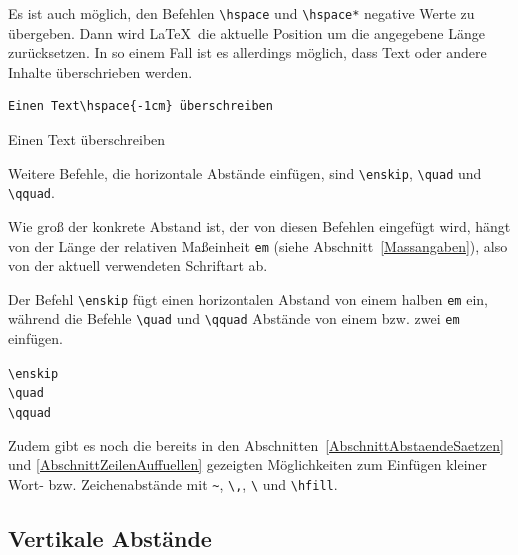 \documentclass[a4paper,10pt,twoside]{scrbook}
\begin{document}
Es ist auch möglich, den Befehlen \verb!\hspace! 
und \verb!\hspace*! negative Werte zu
übergeben. Dann wird \LaTeX\ die aktuelle
Position um die angegebene Länge zurücksetzen. In so einem Fall ist es allerdings
möglich, dass Text oder andere Inhalte überschrieben werden.



\begin{minipage}[c]{0.6\textwidth}
\setlength{\parskip}{1em}
\frenchspacing
\begin{Verbatim}[frame=single]
Einen Text\hspace{-1cm} überschreiben
\end{Verbatim}
\end{minipage}
\hfill
\begin{minipage}[c]{0.36\textwidth}
\setlength{\parskip}{1em}
\frenchspacing
Einen Text\hspace{-1cm} überschreiben
\end{minipage}

Weitere Befehle, die horizontale Abstände einfügen, sind \verb!\enskip!, \verb!\quad! und \verb!\qquad!. 

Wie groß der konkrete Abstand ist, der von diesen Befehlen eingefügt wird, hängt von der Länge der relativen Maßeinheit \verb!em! (siehe Abschnitt~\ref{Massangaben}), also von der aktuell verwendeten Schriftart ab. 

Der Befehl \verb!\enskip! fügt einen horizontalen Abstand von einem halben \verb!em! ein, während die Befehle \verb!\quad! und \verb!\qquad! Abstände von einem bzw. zwei \verb!em! einfügen.

\begin{boxedminipage}{\textwidth}
\texttt{\textbackslash enskip} \\
\texttt{\textbackslash quad}  \\
\texttt{\textbackslash qquad} 
\end{boxedminipage}

Zudem gibt es noch die bereits in den Abschnitten~\ref{AbschnittAbstaendeSaetzen} und \ref{AbschnittZeilenAuffuellen} gezeigten Möglichkeiten zum Einfügen kleiner Wort- bzw. Zeichenabstände mit \verb!~!, \verb!\,!, \texttt{\textbackslash \textvisiblespace} und \verb!\hfill!.

\subsection{Vertikale Abstände}
\end{document}
